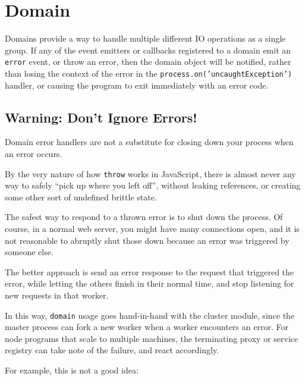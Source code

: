 \section{Domain}

\begin{Shaded}
\begin{Highlighting}[]
\NormalTok{: } 
\end{Highlighting}
\end{Shaded}

Domains provide a way to handle multiple different IO operations as a
single group. If any of the event emitters or callbacks registered to a
domain emit an \texttt{error} event, or throw an error, then the domain
object will be notified, rather than losing the context of the error in
the \texttt{process.on('uncaughtException')} handler, or causing the
program to exit immediately with an error code.

\subsection{Warning: Don't Ignore Errors!}

Domain error handlers are not a substitute for closing down your process
when an error occurs.

By the very nature of how \texttt{throw} works in JavaScript, there is
almost never any way to safely ``pick up where you left off'', without
leaking references, or creating some other sort of undefined brittle
state.

The safest way to respond to a thrown error is to shut down the process.
Of course, in a normal web server, you might have many connections open,
and it is not reasonable to abruptly shut those down because an error
was triggered by someone else.

The better approach is send an error response to the request that
triggered the error, while letting the others finish in their normal
time, and stop listening for new requests in that worker.

In this way, \texttt{domain} usage goes hand-in-hand with the cluster
module, since the master process can fork a new worker when a worker
encounters an error. For node programs that scale to multiple machines,
the terminating proxy or service registry can take note of the failure,
and react accordingly.

For example, this is not a good idea:

